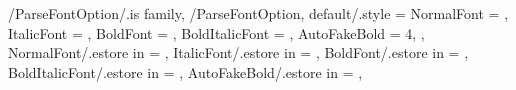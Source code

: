 \newcommand{\SetCustomEngFontFiles}[4]
{%
  \SetFontUseType{\VarFontTypeCustom}
  \renewcommand{\VarFontTypeCustomEngFileNameNormal}{#1}%
  \renewcommand{\VarFontTypeCustomEngFileNameItalic}{#2}%
  \renewcommand{\VarFontTypeCustomEngFileNameBold}{#3}%
  \renewcommand{\VarFontTypeCustomEngFileNameBoldItalic}{#4}%
} %

\newcommand{\SetCustomChiFontFiles}[4]
{%
  \SetFontUseType{\VarFontTypeCustom}
  \renewcommand{\VarFontTypeCustomChiFileNameNormal}{#1}%
  \renewcommand{\VarFontTypeCustomChiFileNameItalic}{#2}%
  \renewcommand{\VarFontTypeCustomChiFileNameBold}{#3}%
  \renewcommand{\VarFontTypeCustomChiFileNameBoldItalic}{#4}%
} %
\newcommand{\VarFontTypeCustom}{10}


\def \VarFontDirPath {./ncku/fonts/} %
\def \GetFontDirPath {\VarFontDirPath}

\newcommand{\VarFontUseType}{\VarFontTypeTimesKaiu} %
\newcommand{\GetFontUseType}{\VarFontUseType}
\newcommand{\SetFontUseType}[1]
{%
  \renewcommand{\VarFontUseType}{#1}%
} %


\pgfkeys
{
  /ParseFontOption/.is family, /ParseFontOption,
  default/.style =
  {
    NormalFont = \empty,
    ItalicFont = \empty,
    BoldFont = \empty,
    BoldItalicFont = \empty,
    AutoFakeBold = 4,
  },
  NormalFont/.estore in = \TmpValueNormalFont,
  ItalicFont/.estore in = \TmpValueItalicFont,
  BoldFont/.estore in = \TmpValueBoldFont,
  BoldItalicFont/.estore in = \TmpValueBoldItalicFont,
  AutoFakeBold/.estore in = \TmpValueAutoFakeBold,
} %

\newcommand{\SetEngMainFont}[2][\empty]
{%
  \pgfkeys{/ParseFontOption, default, #1}%
%
  \defaultfontfeatures[#2]{%
    Path = \GetFontDirPath,
    UprightFont = \TmpValueNormalFont
  }%
  \ifthenelse{\equal{\TmpValueItalicFont}{\empty}}{}{%
    \defaultfontfeatures+[#2]{%
      ItalicFont = \TmpValueItalicFont}}%
  \ifthenelse{\equal{\TmpValueBoldFont}{\empty}}{}{%
    \defaultfontfeatures+[#2]{%
      BoldFont = \TmpValueBoldFont}}%
  \ifthenelse{\equal{\TmpValueBoldItalicFont}{\empty}}{}{%
    \defaultfontfeatures+[#2]{%
      BoldItalicFont = \TmpValueBoldItalicFont}}%
  \defaultfontfeatures+[#2]{%
    AutoFakeBold = \TmpValueAutoFakeBold}%
  \setmainfont{#2}
} %

